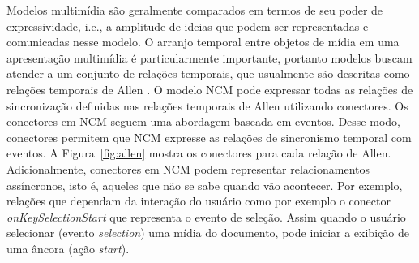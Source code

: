     Modelos multimídia são geralmente comparados em termos de seu poder de expressividade, i.e., a amplitude de ideias que podem ser representadas e comunicadas nesse modelo. O arranjo temporal entre objetos de mídia em uma apresentação multimídia é  particularmente importante, portanto modelos buscam atender a um conjunto de relações temporais, que usualmente são descritas como relações temporais de Allen \cite{allen1990maintaining}. O modelo NCM pode expressar todas as relações de sincronização definidas nas relações temporais de Allen utilizando conectores. Os conectores em NCM seguem uma abordagem baseada em eventos. Desse modo, conectores permitem que NCM expresse as relações de sincronismo temporal com eventos. A Figura~\ref{fig:allen} mostra os conectores para cada relação de Allen. Adicionalmente, conectores em NCM podem representar relacionamentos assíncronos, isto é, aqueles que não se sabe quando vão acontecer. Por exemplo, relações que dependam da interação do usuário como por exemplo o conector \textit{onKeySelectionStart} que representa o evento de seleção. Assim quando o usuário selecionar (evento \textit{selection}) uma mídia do documento, pode iniciar a exibição de uma âncora (ação \textit{start}). 

